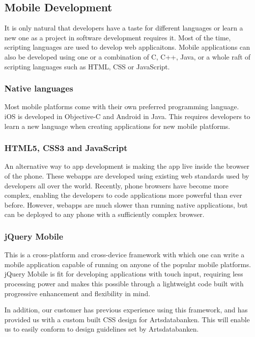 \subsection{Mobile Development}
It is only natural that developers have a taste for different languages or
learn a new one as a project in software development requires it. Most of the time,
scripting languages are used to develop web applicaitons. Mobile applications
can also be developed using one or a combination of C, C++, Java, or a whole raft of scripting languages such as HTML, CSS or JavaScript.

\subsubsection{Native languages}
Most mobile platforms come with their own preferred programming language. iOS is developed in Objective-C and Android in Java. This requires developers to learn a new language when creating applications for new mobile platforms.

\subsubsection{HTML5, CSS3 and JavaScript}
An alternative way to app development is making the app live inside the browser of the phone. These webapps are developed using existing web standards used by developers all over the world. Recently, phone browsers have become more complex, enabling the developers to code applications more powerful than ever before. However, webapps are much slower than running native applications, but can be deployed to any phone with a sufficiently complex browser\cite{phonegap:about}.

\subsubsection{jQuery Mobile}
This is a cross-platform and cross-device framework with which one can write
a mobile application capable of running on anyone of the popular mobile platforms.
jQuery Mobile is fit for developing applications with touch input, requiring
less processing power and  makes this possible through a lightweight code
built with progressive enhancement and flexibility in mind\cite{jquery:jq}.

In addition, our customer has previous experience using this framework, and has provided us with a custom built CSS design for Artsdatabanken. This will enable us to easily conform to design guidelines set by Artsdatabanken.

